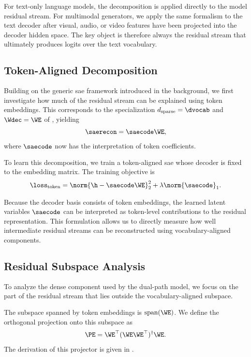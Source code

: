 \documentclass{article}
\begin{document}
For text-only language models, the decomposition is applied directly to the model residual stream. For multimodal generators, we apply the same formalism to the text decoder after visual, audio, or video features have been projected into the decoder hidden space. The key object is therefore always the residual stream that ultimately produces logits over the text vocabulary.

\subsection{Token-Aligned Decomposition}
\label{subsec:method_token_aligned}

Building on the generic \gls{sae} framework introduced in the background, we first investigate how much of the residual stream can be explained using token embeddings. This corresponds to the specialization $d_\mathrm{sparse} = \dvocab$ and $\Wdec = \WE$ of , yielding
\begin{equation}
  \label{eq:token-aligned-reconstruction}
  \saerecon = \saecode \WE,
\end{equation}
where $\saecode$ now has the interpretation of token coefficients.

To learn this decomposition, we train a token-aligned \gls{sae} whose decoder is fixed to the embedding matrix. The training objective is
\begin{equation}
  \loss_{\text{token}} =
  \norm{\h - \saecode \WE}_2^2 + \lambda \norm{\saecode}_1 .
\end{equation}

Because the decoder basis consists of token embeddings, the learned latent variables $\saecode$ can be interpreted as token-level contributions to the residual representation. This formulation allows us to directly measure how well intermediate residual streams can be reconstructed using vocabulary-aligned components.

\subsection{Residual Subspace Analysis}
\label{subsec:method_residual_subspace}

To analyze the dense component used by the dual-path model, we focus on the part of the residual stream that lies outside the vocabulary-aligned subspace.

The subspace spanned by token embeddings is $\mathrm{span}(\WE)$. We define the orthogonal projection onto this subspace as
\begin{equation}
  \label{eq:embedding-projector}
  \PE = \WE^\top (\WE \WE^\top)^{\dagger} \WE .
\end{equation}
The derivation of this projector is given in .
\end{document}
